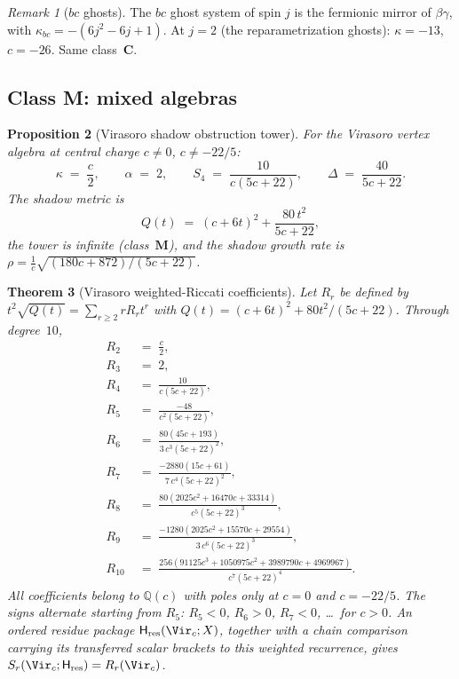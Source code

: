 \documentclass[11pt]{article}
\theoremstyle{plain}
\newtheorem{theorem}{Theorem}[section]
\newtheorem{proposition}[theorem]{Proposition}
\theoremstyle{definition}
\theoremstyle{remark}
\newtheorem{remark}[theorem]{Remark}
\begin{document}
\begin{remark}[$bc$ ghosts]
\label{rem:bc-ghosts}
The $bc$ ghost system of spin $j$ is the fermionic mirror
of $\beta\gamma$, with $\kappa_{bc} = -(6j^2 - 6j + 1)$.
At $j = 2$ (the reparametrization ghosts):
$\kappa = -13$, $c = -26$. Same class~$\mathbf{C}$.
\end{remark}


\subsection{Class M: mixed algebras}
\label{subsec:class-M}

\begin{proposition}[Virasoro shadow obstruction tower]
\label{prop:virasoro-shadow}
For the Virasoro vertex algebra at central charge $c \neq 0$,
$c \neq -22/5$:
\[
 \kappa \;=\; \frac{c}{2},
 \qquad
 \alpha \;=\; 2,
 \qquad
 S_4 \;=\; \frac{10}{c(5c+22)},
 \qquad
 \Delta \;=\; \frac{40}{5c+22}.
\]
The shadow metric is
\[
 Q(t)
 \;=\;
 (c + 6t)^2 + \frac{80\,t^2}{5c + 22},
\]
the tower is infinite \textup{(}class~$\mathbf{M}$\textup{)},
and the shadow growth rate is
$\rho = \frac{1}{c}\sqrt{(180c + 872)/(5c+22)}$.
\end{proposition}

\begin{theorem}[Virasoro weighted-Riccati coefficients]
\label{thm:virasoro-coefficients}
Let $R_r$ be defined by
$t^2\sqrt{Q(t)}=\sum_{r\ge2}rR_rt^r$ with
$Q(t)=(c+6t)^2+80t^2/(5c+22)$.  Through degree~$10$,
\begin{align*}
 R_2 &\;=\; \frac{c}{2},
 \\[3pt]
 R_3 &\;=\; 2,
 \\[3pt]
 R_4 &\;=\; \frac{10}{c(5c+22)},
 \\[3pt]
 R_5 &\;=\; \frac{-48}{c^2(5c+22)},
 \\[3pt]
 R_6 &\;=\; \frac{80(45c+193)}{3\,c^3(5c+22)^2},
 \\[3pt]
 R_7 &\;=\; \frac{-2880(15c+61)}{7\,c^4(5c+22)^2},
 \\[3pt]
 R_8 &\;=\; \frac{80(2025c^2+16470c+33314)}{c^5(5c+22)^3},
 \\[3pt]
 R_9 &\;=\; \frac{-1280(2025c^2+15570c+29554)}{3\,c^6(5c+22)^3},
 \\[3pt]
 R_{10} &\;=\; \frac{256(91125c^3+1050975c^2+3989790c+4969967)}{c^7(5c+22)^4}.
\end{align*}
All coefficients belong to $\mathbb{Q}(c)$ with poles
only at $c = 0$ and $c = -22/5$. The signs alternate
starting from $R_5$:
$R_5 < 0$, $R_6 > 0$, $R_7 < 0$, \ldots\ for $c > 0$.
An ordered residue package $\mathsf H_{\mathrm{res}}(\Vir_c;X)$,
together with a chain comparison carrying its transferred scalar
brackets to this weighted recurrence, gives
$S_r(\Vir_c;\mathsf H_{\mathrm{res}})=R_r(\Vir_c)$.
\end{theorem}
\end{document}
